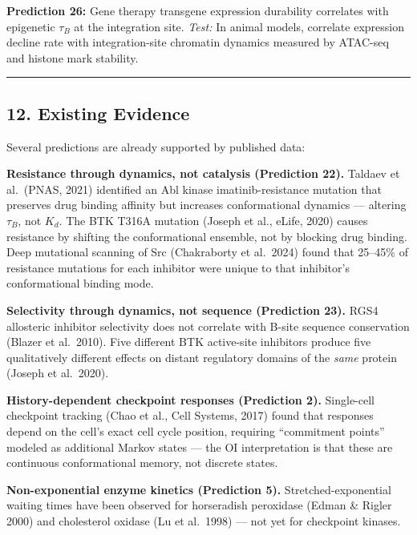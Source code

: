 \documentclass[
]{article}
\begin{document}
\textbf{Prediction 26:} Gene therapy transgene expression durability
correlates with epigenetic \(\tau_B\) at the integration site.
\emph{Test:} In animal models, correlate expression decline rate with
integration-site chromatin dynamics measured by ATAC-seq and histone
mark stability.

\begin{center}\rule{0.5\linewidth}{0.5pt}\end{center}

\hypertarget{existing-evidence}{%
\subsection{12. Existing Evidence}\label{existing-evidence}}

Several predictions are already supported by published data:

\textbf{Resistance through dynamics, not catalysis (Prediction 22).}
Taldaev et al.~(PNAS, 2021) identified an Abl kinase imatinib-resistance
mutation that preserves drug binding affinity but increases
conformational dynamics --- altering \(\tau_B\), not \(K_d\). The BTK
T316A mutation (Joseph et al., eLife, 2020) causes resistance by
shifting the conformational ensemble, not by blocking drug binding. Deep
mutational scanning of Src (Chakraborty et al.~2024) found that 25--45\%
of resistance mutations for each inhibitor were unique to that
inhibitor's conformational binding mode.

\textbf{Selectivity through dynamics, not sequence (Prediction 23).}
RGS4 allosteric inhibitor selectivity does not correlate with B-site
sequence conservation (Blazer et al.~2010). Five different BTK
active-site inhibitors produce five qualitatively different effects on
distant regulatory domains of the \emph{same} protein (Joseph et
al.~2020).

\textbf{History-dependent checkpoint responses (Prediction 2).}
Single-cell checkpoint tracking (Chao et al., Cell Systems, 2017) found
that responses depend on the cell's exact cell cycle position, requiring
``commitment points'' modeled as additional Markov states --- the OI
interpretation is that these are continuous conformational memory, not
discrete states.

\textbf{Non-exponential enzyme kinetics (Prediction 5).}
Stretched-exponential waiting times have been observed for horseradish
peroxidase (Edman \& Rigler 2000) and cholesterol oxidase (Lu et
al.~1998) --- not yet for checkpoint kinases.
\end{document}
